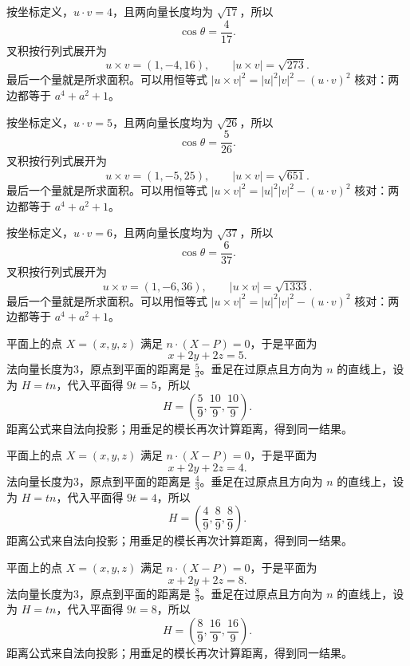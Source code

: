 \documentclass[UTF8,12pt,a4paper,fontset=fandol]{ctexart}
\begin{document}
\begin{solve}\label{ans:c31q4}
按坐标定义，$u\cdot v=4$，且两向量长度均为 $\sqrt{17}$，所以
\[
\cos\theta=\frac{4}{17}.
\]
叉积按行列式展开为
\[
u\times v=(1,-4,16),\qquad |u\times v|=\sqrt{273}.
\]
最后一个量就是所求面积。可以用恒等式 $|u\times v|^2=|u|^2|v|^2-(u\cdot v)^2$ 核对：两边都等于 $a^4+a^2+1$。
\end{solve}

\begin{solve}\label{ans:c31q5}
按坐标定义，$u\cdot v=5$，且两向量长度均为 $\sqrt{26}$，所以
\[
\cos\theta=\frac{5}{26}.
\]
叉积按行列式展开为
\[
u\times v=(1,-5,25),\qquad |u\times v|=\sqrt{651}.
\]
最后一个量就是所求面积。可以用恒等式 $|u\times v|^2=|u|^2|v|^2-(u\cdot v)^2$ 核对：两边都等于 $a^4+a^2+1$。
\end{solve}

\begin{solve}\label{ans:c31q6}
按坐标定义，$u\cdot v=6$，且两向量长度均为 $\sqrt{37}$，所以
\[
\cos\theta=\frac{6}{37}.
\]
叉积按行列式展开为
\[
u\times v=(1,-6,36),\qquad |u\times v|=\sqrt{1333}.
\]
最后一个量就是所求面积。可以用恒等式 $|u\times v|^2=|u|^2|v|^2-(u\cdot v)^2$ 核对：两边都等于 $a^4+a^2+1$。
\end{solve}

\begin{solve}\label{ans:c31q7}
平面上的点 $X=(x,y,z)$ 满足 $n\cdot(X-P)=0$，于是平面为
\[
x+2y+2z=5.
\]
法向量长度为3，原点到平面的距离是 $\frac{5}{3}$。垂足在过原点且方向为 $n$ 的直线上，设为 $H=tn$，代入平面得 $9t=5$，所以
\[
H=\left(\frac{5}{9},\frac{10}{9},\frac{10}{9}\right).
\]
距离公式来自法向投影；用垂足的模长再次计算距离，得到同一结果。
\end{solve}

\begin{solve}\label{ans:c31q8}
平面上的点 $X=(x,y,z)$ 满足 $n\cdot(X-P)=0$，于是平面为
\[
x+2y+2z=4.
\]
法向量长度为3，原点到平面的距离是 $\frac{4}{3}$。垂足在过原点且方向为 $n$ 的直线上，设为 $H=tn$，代入平面得 $9t=4$，所以
\[
H=\left(\frac{4}{9},\frac{8}{9},\frac{8}{9}\right).
\]
距离公式来自法向投影；用垂足的模长再次计算距离，得到同一结果。
\end{solve}

\begin{solve}\label{ans:c31q9}
平面上的点 $X=(x,y,z)$ 满足 $n\cdot(X-P)=0$，于是平面为
\[
x+2y+2z=8.
\]
法向量长度为3，原点到平面的距离是 $\frac{8}{3}$。垂足在过原点且方向为 $n$ 的直线上，设为 $H=tn$，代入平面得 $9t=8$，所以
\[
H=\left(\frac{8}{9},\frac{16}{9},\frac{16}{9}\right).
\]
距离公式来自法向投影；用垂足的模长再次计算距离，得到同一结果。
\end{solve}
\end{document}
